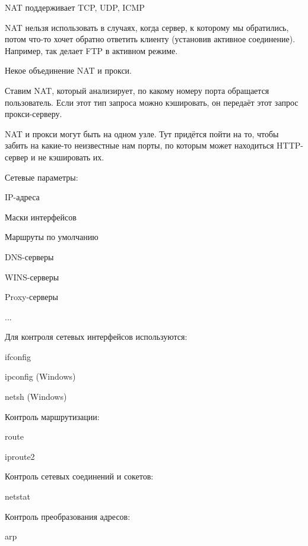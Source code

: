 NAT поддерживает TCP, UDP, ICMP

NAT нельзя использовать в случаях, когда сервер, к которому мы обратились, потом что-то хочет обратно ответить клиенту (установив активное соединение). Например, так делает FTP в активном режиме.


Некое объединение NAT и прокси.

Ставим NAT, который анализирует, по какому номеру порта обращается пользователь. Если этот тип запроса можно кэшировать, он передаёт этот запрос прокси-серверу.

NAT и прокси могут быть на одном узле. Тут придётся пойти на то, чтобы забить на какие-то неизвестные нам порты, по которым может находиться HTTP-сервер и не кэшировать их.


Сетевые параметры:
\begin{MyItemize}
    \item IP-адреса
    \item Маски интерфейсов
    \item Маршруты по умолчанию
    \item DNS-серверы
    \item WINS-серверы
    \item Proxy-серверы
    \item ...
\end{MyItemize}

Для контроля сетевых интерфейсов используются:
\begin{MyItemize}
    \item ifconfig
    \item ipconfig (Windows)
    \item netsh (Windows)
\end{MyItemize}

Контроль маршрутизации:
\begin{MyItemize}
    \item route
    \item iproute2
\end{MyItemize}

Контроль сетевых соединений и сокетов:
\begin{MyItemize}
    \item netstat
\end{MyItemize}

Контроль преобразования адресов:
\begin{MyItemize}
    \item arp
\end{MyItemize}

